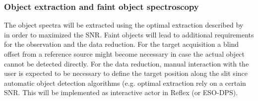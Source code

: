 





\subsubsection{Object extraction and faint object spectroscopy}\label{sec:fospectro}
The object spectra will be extracted using the optimal extraction described by~\cite{pis21} in order to maximized the \ac{SNR}. 
Faint objects will lead to additional requirements for the observation and the data reduction. For the target acquisition a blind offset from a reference source might become necessary in case the actual object cannot be detected directly. For the data reduction, manual interaction with the user is expected to be necessary to define the target position along the slit since automatic object detection algorithms (e.g. optimal extraction %
rely on a certain \ac{SNR}. This will be implemented as interactive actor in Reflex (or ESO-DPS).